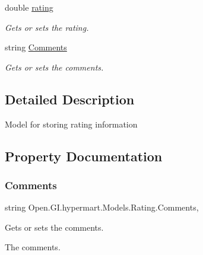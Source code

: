 \begin{DoxyCompactItemize}
double \hyperlink{class_open_1_1_g_i_1_1hypermart_1_1_models_1_1_rating_a1090f6d360b3768ba5ad879befb798e0}{rating}
\begin{DoxyCompactList}\small\item\em Gets or sets the rating. \end{DoxyCompactList}\item 
string \hyperlink{class_open_1_1_g_i_1_1hypermart_1_1_models_1_1_rating_a1b1467d2d1898f6109cc19ec24ee7fd4}{Comments}
\begin{DoxyCompactList}\small\item\em Gets or sets the comments. \end{DoxyCompactList}\end{DoxyCompactItemize}


\subsection{Detailed Description}
Model for storing rating information 



\subsection{Property Documentation}
\hypertarget{class_open_1_1_g_i_1_1hypermart_1_1_models_1_1_rating_a1b1467d2d1898f6109cc19ec24ee7fd4}{}\label{class_open_1_1_g_i_1_1hypermart_1_1_models_1_1_rating_a1b1467d2d1898f6109cc19ec24ee7fd4} 
\subsubsection{\texorpdfstring{Comments}{Comments}}
{\footnotesize\ttfamily string Open.\+G\+I.\+hypermart.\+Models.\+Rating.\+Comments\hspace{0.3cm}{\ttfamily [get]}, {\ttfamily [set]}}



Gets or sets the comments. 

The comments. \hypertarget{class_open_1_1_g_i_1_1hypermart_1_1_models_1_1_rating_a84ebcfe9c03b3ee3859323be1a9b02da}{}\label{class_open_1_1_g_i_1_1hypermart_1_1_models_1_1_rating_a84ebcfe9c03b3ee3859323be1a9b02da} 
